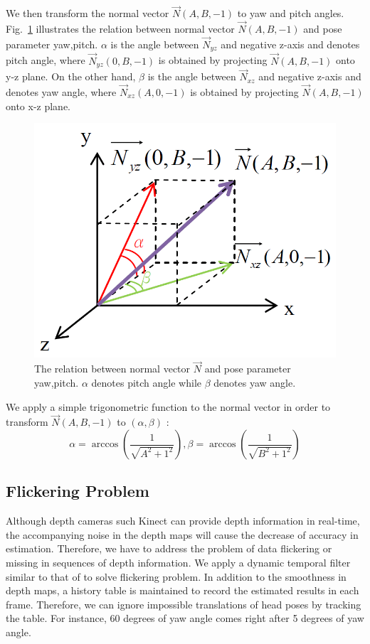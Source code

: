 We then transform the normal vector $\vec{N}(A,B,-1)$ to yaw and pitch angles. Fig.~\ref{fig:11} illustrates the relation between normal vector $\vec{N}(A,B,-1)$ and pose parameter {yaw,pitch}. $\alpha$ is the angle between $\vec{N}_{yz}$ and negative z-axis and denotes pitch angle, where $\vec{N}_{yz}(0,B,-1)$ is obtained by projecting $\vec{N}(A,B,-1)$ onto y-z plane. On the other hand, $\beta$ is the angle between $\vec{N}_{xz}$ and negative z-axis and denotes yaw angle, where $\vec{N}_{xz}(A,0,-1)$ is obtained by projecting $\vec{N}(A,B,-1)$ onto x-z plane.

\begin{figure}
\centering
\includegraphics[width=0.7\linewidth]{./fig11.png}
\caption{The relation between normal vector $\vec{N}$ and pose parameter {yaw,pitch}. $\alpha$ denotes pitch angle while $\beta$ denotes yaw angle.}
\label{fig:11}       %
\end{figure}

We apply a simple trigonometric function to the normal vector in order to transform $\vec{N}(A,B,-1)$ to $(\alpha,\beta )$ :
\begin{equation}
\alpha = \arccos{(\frac{1}{\sqrt{A^2+1^2}})},
\beta  = \arccos{(\frac{1}{\sqrt{B^2+1^2}})}
\end{equation}

\subsection{Flickering Problem}
\label{subsec:Flickering}
Although depth cameras such Kinect can provide depth information in real-time, the accompanying noise in the depth maps will cause the decrease of accuracy in estimation. Therefore, we have to address the problem of data flickering or missing in sequences of depth information. We apply a dynamic temporal filter similar to that of \cite{Ref19} to solve flickering problem. In addition to the smoothness in depth maps, a history table is maintained to record the estimated results in each frame. Therefore, we can ignore impossible translations of head poses by tracking the table. For instance, 60 degrees of yaw angle comes right after 5 degrees of yaw angle. 
